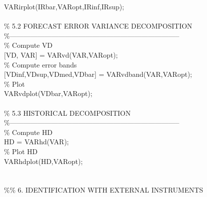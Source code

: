 \hspace{1mm}VARirplot(IRbar,VARopt,IRinf,IRsup); \\ 
\hspace{1mm} \\ 
\hspace{1mm}\textcolor{matlabgreen}{\% 5.2 FORECAST ERROR VARIANCE DECOMPOSITION }\\ 
\hspace{1mm}\textcolor{matlabgreen}{\%--------------------------------------------------------------------------  }\\ 
\hspace{1mm}\textcolor{matlabgreen}{\% Compute VD }\\ 
\hspace{1mm}[VD, VAR] = VARvd(VAR,VARopt); \\ 
\hspace{1mm}\textcolor{matlabgreen}{\% Compute error bands }\\ 
\hspace{1mm}[VDinf,VDsup,VDmed,VDbar] = VARvdband(VAR,VARopt); \\ 
\hspace{1mm}\textcolor{matlabgreen}{\% Plot }\\ 
\hspace{1mm}VARvdplot(VDbar,VARopt); \\ 
\hspace{1mm} \\ 
\hspace{1mm}\textcolor{matlabgreen}{\% 5.3 HISTORICAL DECOMPOSITION }\\ 
\hspace{1mm}\textcolor{matlabgreen}{\%--------------------------------------------------------------------------  }\\ 
\hspace{1mm}\textcolor{matlabgreen}{\% Compute HD }\\ 
\hspace{1mm}HD = VARhd(VAR); \\ 
\hspace{1mm}\textcolor{matlabgreen}{\% Plot HD }\\ 
\hspace{1mm}VARhdplot(HD,VARopt); \\ 
\hspace{1mm} \\ 
\hspace{1mm} \\ 
\hspace{1mm}\textcolor{matlabgreen}{\%}\textcolor{matlabgreen}{\% 6. IDENTIFICATION WITH EXTERNAL INSTRUMENTS }\\ 
